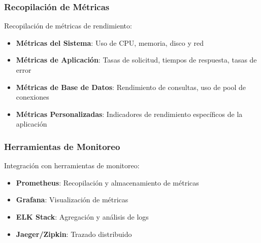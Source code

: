 \subsubsection{Recopilación de Métricas}
Recopilación de métricas de rendimiento:

\begin{itemize}
    \item \textbf{Métricas del Sistema}: Uso de CPU, memoria, disco y red
    \item \textbf{Métricas de Aplicación}: Tasas de solicitud, tiempos de respuesta, tasas de error
    \item \textbf{Métricas de Base de Datos}: Rendimiento de consultas, uso de pool de conexiones
    \item \textbf{Métricas Personalizadas}: Indicadores de rendimiento específicos de la aplicación
\end{itemize}

\subsubsection{Herramientas de Monitoreo}
Integración con herramientas de monitoreo:

\begin{itemize}
    \item \textbf{Prometheus}: Recopilación y almacenamiento de métricas
    \item \textbf{Grafana}: Visualización de métricas
    \item \textbf{ELK Stack}: Agregación y análisis de logs
    \item \textbf{Jaeger/Zipkin}: Trazado distribuido
\end{itemize}

